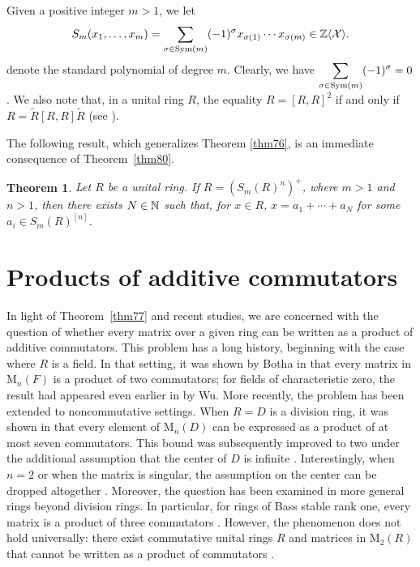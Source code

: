 \documentclass[11pt]{article}
\newtheorem{theorem}{Theorem}
\theoremstyle{definition}
\begin{document}
{{{{				Given a positive integer $m>1$, we let
				$$
				S_m(x_1,\ldots,x_m)=\sum_{\sigma\in \text{\rm Sym}(m)}(-1)^{\sigma}x_{\sigma(1)}\cdots x_{\sigma(m)}\in \Bbb Z\langle \mathcal{X} \rangle.
				$$
				denote the standard polynomial of degree $m$. Clearly, we have $\displaystyle\sum_{\sigma\in \text{\rm Sym}(m)}(-1)^{\sigma}=0$. We also note that, in a unital ring $R$, the equality $R=[R, R]^2$ if and only if $R=\widetilde R[R, R]\widetilde R$ (see \cite[Theorem 3.10]{calugareanu2026}).
				
				The following result, which generalizes Theorem \ref{thm76}, is an immediate consequence of Theorem~\ref{thm80}.
				
				\begin{theorem}\label{thm81}
					Let $R$ be a unital ring.
					If $R=(S_m(R)^n)^+$, where $m>1$ and $n>1$, then there exists $N\in \Bbb N$ such that, for $x\in R$,
					$x=a_1+\cdots+a_N$ for some $a_i\in S_m(R)^{[n]}$.
				\end{theorem}
				
				\section{Products of additive commutators}\label{sec product}
				
			
				
				In light of Theorem~\ref{thm77} and recent studies, we are concerned with the question of whether every matrix over a given ring can be written as a product of additive commutators. This problem has a long history, beginning with the case where \( R \) is a field. In that setting, it was shown by Botha in \cite[Theorem 4.1]{Pa_Botha_97} that every matrix in \( \mathrm{M}_n(F) \) is a product of two  commutators; for fields of characteristic zero, the result had appeared even earlier in \cite{Pa_Wu_89} by Wu. More recently, the problem has been extended to noncommutative settings. When \( R = D \) is a division ring, it was shown in \cite[Theorem ~4.4]{Pa_SoDu_25} that every element of \( \mathrm{M}_n(D) \) can be expressed as a product of at most seven commutators. This bound was subsequently improved to two under the additional assumption that the center of \( D \) is infinite \cite[Theorem ~4.4]{Pa_Bre_25}. Interestingly, when \( n = 2 \) or when the matrix is singular, the assumption on the center can be dropped altogether \cite[Propositions~4.2 and~4.7]{Pa_Bre_25}. Moreover, the question has been examined in more general rings beyond division rings. In particular, for rings of Bass stable rank one, every matrix is a product of three commutators \cite[Theorem 3.9]{Pa_Bre_25}. However, the phenomenon does not hold universally: there exist commutative unital rings \( R \) and matrices in \(  \mathrm{M}_2(R) \) that cannot be written as a product of commutators \cite[Theorem~2.2]{Pa_Bre_25}.
				
}}}}
\end{document}
